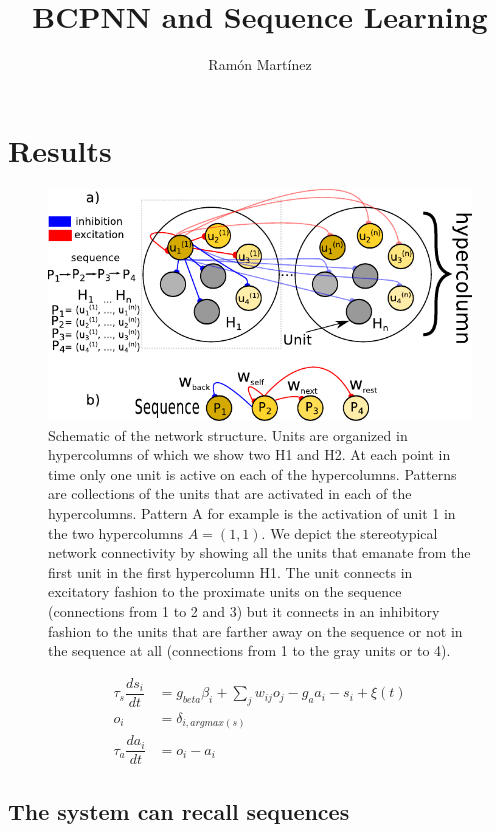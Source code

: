 \documentclass[10pt,a4paper]{article}
\author{Ram\'on Mart\'inez}
\title{BCPNN and Sequence Learning}
\begin{document}
\maketitle

\section{Results}
\begin{figure}[H]
\centering
\includegraphics[scale=1.0]{diagram.pdf}
\caption{Schematic of the network structure. Units are organized in hypercolumns of which we show two H1 and H2. At each point in time only one unit is active on each of the hypercolumns.  Patterns are collections of the units that are activated in each of the hypercolumns. Pattern A for example is the activation of unit 1 in the two hypercolumns $A=(1, 1)$. We depict the stereotypical network connectivity by showing all the units that emanate from the first unit in the first hypercolumn H1. The unit connects in excitatory fashion to the proximate units on the sequence (connections from 1 to 2 and 3) but it connects in an inhibitory fashion to the units that are farther away on the sequence or not in the sequence at all (connections from 1 to the gray units or to 4).  }
\label{fig:networks_scheme}
\end{figure}


\begin{align}
\tau_s \dfrac{ds_i}{dt} &= g_{beta}\beta_i + \sum_{j} w_{ij} o_j  - g_a a_i - s_i  + \xi(t) \label{eq:simple_bcpnn} \\ 
o_i &=  \delta_{i, argmax(s)} \label{eq:simple_bcpnn_max} \\ 
\tau_a \dfrac{da_i}{dt} &= o_i - a_i \label{eq:simple_bcpnn_adaptation}
\end{align}


\subsection{The system can recall sequences}
\end{document}
